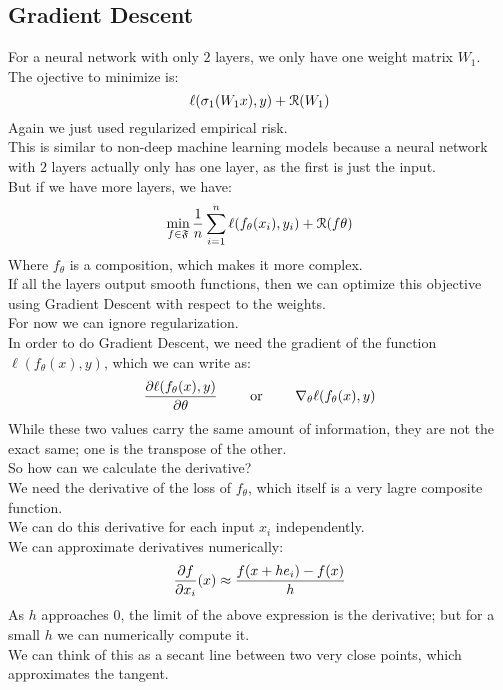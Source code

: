 \documentclass[12pt]{article}
\begin{document}
\newpage

\subsection*{Gradient Descent}

For a neural network with only $2$ layers, we
only have one weight matrix $W_1$. \\
The ojective to minimize is:
\[ \ell(\sigma_1(W_1 x), y) + \mathcal{R}(W_1) \]
Again we just used regularized empirical risk. \\
This is similar to non-deep machine learning models
because a neural network with $2$ layers actually
only has one layer, as the first is just the input. \\

But if we have more layers, we have:
\[ \min_{f \in \mathfrak{F}} \dfrac{1}{n}
\sum_{i=1}^n \ell(f_\theta(x_i), y_i) + \mathcal{R}(f\theta) \]
Where $f_\theta$ is a composition, which makes it more
complex. \\

If all the layers output smooth functions, then we can
optimize this objective using Gradient Descent
with respect to the weights. \\

For now we can ignore regularization. \\

In order to do Gradient Descent, we need the gradient
of the function $\ell(f_\theta(x), y)$,
which we can write as:
\[ \dfrac{\partial \ell(f_\theta(x), y)}{\partial \theta}
\qquad \text{ or } \qquad \nabla_\theta \ell(f_\theta(x), y) \]
While these two values carry the same amount 
of information, they are not the exact same; 
one is the transpose of the other. \\

So how can we calculate the derivative? \\
We need the derivative of the loss
of $f_\theta$, 
which itself is a very lagre composite function. \\
We can do this derivative for each input $x_i$
independently. \\

We can approximate derivatives numerically:
\[ \dfrac{\partial f}{\partial x_i}(x) \approx 
\dfrac{f(x + h e_i) - f(x)}{h} \]
As $h$ approaches $0$, the limit of the above expression
is the derivative; but for a small $h$
we can numerically compute it. \\
We can think of this as a secant line between two very
close points, which approximates the tangent. \\
\end{document}
